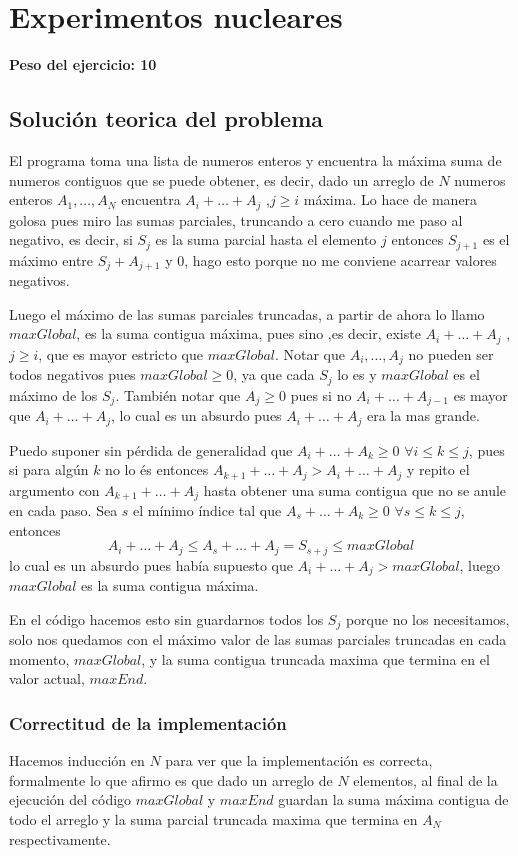 \newpage{}
\section{Experimentos nucleares}
\textbf{Peso del ejercicio: 10}
\subsection{Soluci\'on teorica del problema}
El programa toma una lista de numeros enteros y encuentra la m\'axima suma
de numeros contiguos que se puede obtener, es decir, dado un arreglo
de $N$ numeros enteros $A_1,\dots, A_N$ encuentra $A_i+\dots+A_j$ ,$j\geq i$ 
m\'axima. Lo hace de manera golosa pues miro las sumas parciales, truncando
a cero cuando me paso al negativo, es decir, si $S_j$ es la suma parcial 
hasta el elemento $j$ entonces $S_{j+1}$ es el m\'aximo entre $S_j+A_{j+1}$ 
y $0$, hago esto porque no me conviene acarrear valores negativos.


Luego el m\'aximo de las sumas parciales truncadas, a partir de ahora
lo llamo $maxGlobal$, es la suma contigua m\'axima, pues sino ,es decir, 
existe $A_i+\dots +A_j$ ,$j\geq i$, que es mayor estricto que $maxGlobal$.
Notar que $A_i,\dots ,A_j$ no pueden ser todos negativos pues
$maxGlobal\geq 0$, ya que cada $S_j$ lo es y $maxGlobal$ es el m\'aximo
de los $S_j$. Tambi\'en notar que $A_j\geq 0$ pues si no $A_i+\dots +A_{j-1}$
es mayor que $A_i+\dots +A_j$, lo cual es un absurdo pues $A_i+\dots +A_j$
era la mas grande.


Puedo suponer sin p\'erdida de generalidad que $A_i+\dots +A_k\geq 0$ 
$\forall i\leq k\leq j$, pues si para alg\'un $k$ no lo \'es entonces 
$A_{k+1}+\dots + A_j>A_i+\dots +A_j$ y repito el argumento con 
$A_{k+1}+ \dots +A_j$ hasta obtener una suma contigua que no se anule en 
cada paso. Sea $s$ el m\'inimo \'indice tal que $A_s+\dots+A_k\geq 0$ 
$\forall s\leq k\leq j$, entonces
\begin{equation}
	A_i+\dots +A_j \leq A_s+\dots+A_j = S_{s+j} \leq maxGlobal
\end{equation}
lo cual es un absurdo pues hab\'ia supuesto que $A_i+\dots +A_j>maxGlobal$,
luego $maxGlobal$ es la suma contigua m\'axima.

En el c\'odigo hacemos esto sin guardarnos todos los $S_j$ porque no los 
necesitamos, solo nos quedamos con el m\'aximo valor de las sumas parciales
truncadas en cada momento, $maxGlobal$, y la suma contigua truncada maxima
que termina en el valor actual, $maxEnd$.

\subsubsection{Correctitud de la implementaci\'on}
Hacemos inducci\'on en $N$ para ver que la implementaci\'on es correcta, 
formalmente lo que afirmo es que dado un arreglo de $N$ elementos, al 
final de la ejecuci\'on del c\'odigo $maxGlobal$ y $maxEnd$ guardan la 
suma m\'axima contigua de todo el arreglo y la suma parcial truncada maxima
que termina en $A_N$ respectivamente.

